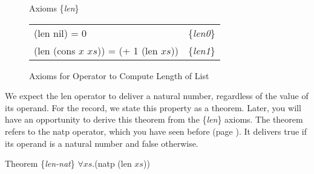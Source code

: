\begin{figure}
\begin{center}
Axioms \{\emph{len}\} \\
\begin{tabular}{ll}
(len nil) = 0                            & \{\emph{len0}\} \\
(len (cons $x$ $xs$)) = (+ 1 (len $xs$)) & \{\emph{len1}\}
\end{tabular}
\end{center}
\caption{Axioms for Operator to Compute Length of List}
\label{len-equations}
\label{fig:len-axioms}
\end{figure}

\begin{comment}
We also expect the ``len'' operator to deliver a natural number, regardless of what its argument is. We can state this in the form of a theorem using the ``natp'' operator, which delivers true if its argument is a natural number and false if it isn't.

\label{len-nat-thm}
\begin{Verbatim}
(defthmd len-is-natural-number-thm
  (natp (len xs)))
\end{Verbatim}

ACL2 succeeds in proving this theorem, too, so we now know that the formula (len $xs$) delivers a non-negative integer, regardless of what formula $xs$ stands for. We will use the label \{\emph{len-nat}\} when we cite this theorem in proofs.

A related fact is that the formula (consp $xs$) is logically equivalent to the formula (\verb+>+ (len $xs$) 0). In the notation from Chapter~\ref{ch:Boolean-Formulas}: (consp $xs$)$\leftrightarrow$(\verb+>+ (len $xs$) 0). The name of the equivalence operator in ACL2 is ``iff'', so in ACL2 notation, the formula would be:
(iff (consp $xs$) (\verb+>+ (len $xs$) 0)). Or, stated as a theorem, it looks like this:

\begin{Verbatim}
(defthmd consp<->len>0-thm
  (iff (consp xs) (> (len xs) 0)))
\end{Verbatim}
\end{comment}

We expect the len operator to deliver a natural number,
regardless of the value of its operand.
For the record, we state this property as a theorem.
Later, you will have an opportunity to derive
this theorem from the \{\emph{len}\} axioms.
The theorem refers to the natp operator,
which you have seen before (page \pageref{natp-op}).
It delivers true if its operand is a natural number and false otherwise.
\begin{samepage}
\label{len-nat-thm}
\begin{center}
Theorem \{\emph{len-nat}\} $\forall xs.$(natp (len $xs$))
\end{center}
\end{samepage}

